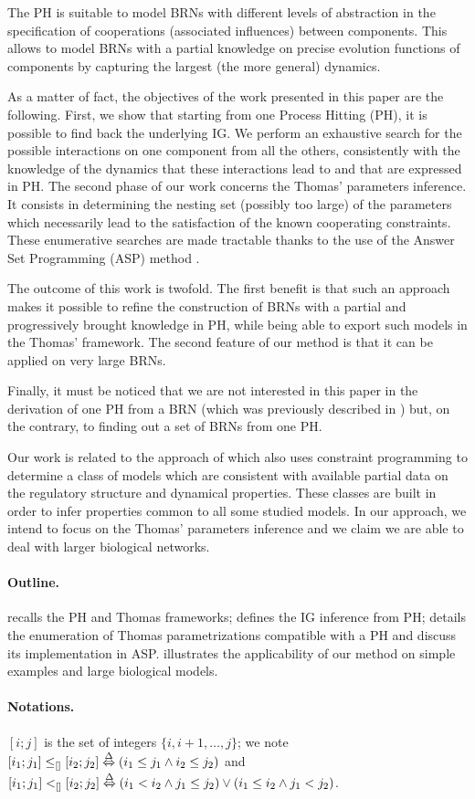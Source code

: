 The PH is suitable to model BRNs with different levels of abstraction in the specification of
cooperations (associated influences) between components.
This allows to model BRNs with a partial knowledge on precise evolution functions of components
by capturing the largest (the more general) dynamics.

As a matter of fact, the objectives of the work presented in this paper are the following.
First, we show that starting from one Process Hitting (PH), it is possible to find
back the underlying IG.
We perform an exhaustive search for the possible interactions on one component from all the
others, consistently with the knowledge of the dynamics that these interactions lead to and that are
expressed in PH.
The second phase of our work concerns the Thomas' parameters inference.
It consists in determining the nesting set (possibly too large) of the parameters which necessarily lead to the satisfaction of the known cooperating constraints.
These enumerative searches are made tractable thanks to the use of the Answer Set Programming (ASP) method \cite{Baral03}.

The outcome of this work is twofold.
The first benefit is that such an approach makes it possible to refine the construction of
BRNs with a partial and progressively brought knowledge in PH, while being able to export such
models in the Thomas' framework.
The second feature of our method is that it can be applied on very large BRNs.

Finally, it must be noticed that we are not interested in this paper in the derivation of one
PH from a BRN (which was previously described in \cite{PMR10-TCSB}) but, on the contrary, to finding out
a set of BRNs from one PH.

Our work is related to the approach of \cite{20646302,DBLP:conf/ipcat/CorblinFTCT12} which also uses constraint programming to determine a class of models which are consistent with available partial data on the regulatory structure and dynamical properties.
These classes are built in order to infer properties common to all some studied models.
In our approach, we intend to focus on the Thomas' parameters inference and we claim we are able to deal with larger biological networks.

\paragraph{Outline.}
 recalls the PH and Thomas frameworks;
 defines the IG inference from PH;
 details the enumeration of Thomas parametrizations compatible with a PH
and discuss its implementation in ASP.
 illustrates the applicability of our method on simple examples
and large biological models.

\paragraph{Notations.}
$[i;j]$ is the set of integers $\{ i, i+1, \dots, j \}$;
we note $[i_1;j_1] \leq_{[]} [i_2;j_2] \stackrel{\Delta}\Leftrightarrow (i_1\leq j_1\wedge i_2\leq j_2)$
and $[i_1;j_1] <_{[]} [i_2;j_2] \stackrel{\Delta}\Leftrightarrow 
(i_1<i_2 \wedge j_1\leq j_2) \vee (i_1\leq i_2\wedge j_1 < j_2)$.
